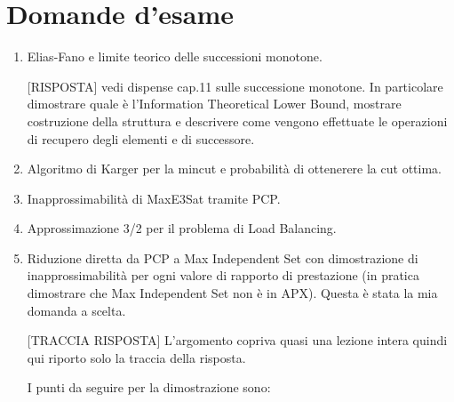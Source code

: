 \documentclass[\main/main.tex]{subfiles}
\begin{document}
\chapter{Domande d'esame}
\begin{enumerate}
    \item Elias-Fano e limite teorico delle successioni monotone.
    
    [RISPOSTA] vedi dispense cap.11 sulle successione monotone. In particolare dimostrare quale è l'Information Theoretical Lower Bound, mostrare costruzione della struttura e descrivere come vengono effettuate le operazioni di recupero degli elementi e di successore. 
    \item Algoritmo di Karger per la mincut e probabilità di ottenerere la cut ottima.
    \item Inapprossimabilità di MaxE3Sat tramite PCP.
    \item Approssimazione 3/2 per il problema di Load Balancing.
    \item Riduzione diretta da PCP a Max Independent Set con dimostrazione di inapprossimabilità per ogni valore di rapporto di prestazione (in pratica dimostrare che Max Independent Set non è in APX). Questa è stata la mia domanda a scelta.
    
    [TRACCIA RISPOSTA] L'argomento copriva quasi una lezione intera quindi qui riporto solo la traccia della risposta.
    
    I punti da seguire per la dimostrazione sono:
    

\end{enumerate}
\end{document}
